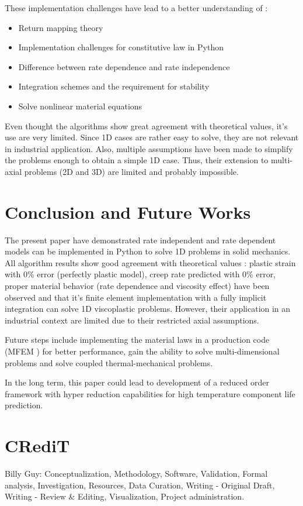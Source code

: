 \documentclass[final,5p,times,twocolumn]{elsarticle}
\begin{document}
These implementation challenges have lead to a better understanding of :
\begin{itemize}
  \item Return mapping theory
  \item Implementation challenges for constitutive law in Python
  \item Difference between rate dependence and rate independence
  \item Integration schemes and the requirement for stability
  \item Solve nonlinear material equations
\end{itemize} 

Even thought the algorithms show great agreement with theoretical values, it's use are very limited. Since 1D cases are rather easy to solve, they are not relevant in industrial application. Also, multiple assumptions have been made to simplify the problems enough to obtain a simple 1D case. Thus, their extension to multi-axial problems (2D and 3D) are limited and probably impossible.

\section{Conclusion and Future Works}
\label{sec:Conclusion}
The present paper have demonstrated rate independent and rate dependent models can be implemented in Python to solve 1D problems in solid mechanics. All algorithm results show good agreement with theoretical values : plastic strain with 0\% error (perfectly plastic model), creep rate predicted with 0\% error, proper material behavior (rate dependence and viscosity effect) have been observed and that it's finite element implementation with a fully implicit integration can solve 1D viscoplastic problems. However, their application in an industrial context are limited due to their restricted axial assumptions.

Future steps include implementing the material laws in a production code (MFEM \cite{mfem-2024}) for better performance, gain the ability to solve multi-dimensional problems and solve coupled thermal-mechanical problems. 

In the long term, this paper could lead to development of a reduced order framework with hyper reduction capabilities for high temperature component life prediction.


\section{CRediT}
Billy Guy: Conceptualization, Methodology, Software, Validation, Formal analysis, Investigation, Resources, Data Curation, Writing - Original Draft, Writing - Review \& Editing, Visualization, Project administration.
\end{document}
